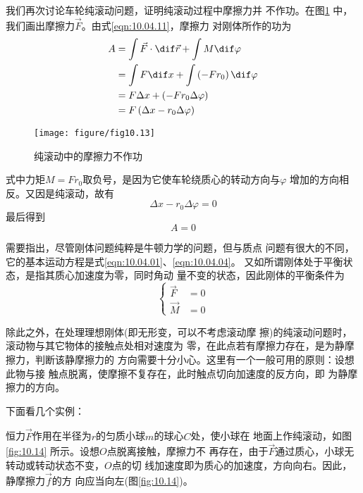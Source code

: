 \documentclass[../outline-of-mechanics.tex]{subfiles}
\begin{document}
我们再次讨论车轮纯滚动问题，证明纯滚动过程中摩擦力并
不作功。在图\ref{fig:10.13} 中，我们画出摩擦力$\vec{F}$。由式\eqref{eqn:10.04.11}，摩擦力
对刚体所作的功为
\begin{equation*}
  \begin{split}
    A &= \int \vec{ F } \cdot \dif \vec{r} + \int M \dif \varphi \\
    &= \int F \dif x + \int \left( - F r _ { 0 } \right) \dif \varphi \\
    &= F \Delta x + \left( - F r _ { 0 } \Delta \varphi \right) \\%
    &= F \left( \Delta x - r _ { 0 } \Delta \varphi \right)
  \end{split}
\end{equation*}

\clearpage
\begin{figure}[h]
  \centering
  \texttt{[image: figure/fig10.13]}
  \caption{纯滚动中的摩擦力不作功}
  \label{fig:10.13}
\end{figure}
式中力矩$ M = F r _ { 0 } $取负号，是因为它使车轮绕质心的转动方向与$ \varphi $
增加的方向相反。又因是纯滚动，故有
\begin{equation*}
  \Delta x - r _ { 0 } \Delta \varphi = 0
\end{equation*}
最后得到
\begin{equation*}
  A = 0
\end{equation*}

需要指出，尽管刚体问题纯粹是牛顿力学的问题，但与质点
问题有很大的不同，它的基本运动方程是式\eqref{eqn:10.04.01}、\eqref{eqn:10.04.04}。
又如所谓刚体处于平衡状态，是指其质心加速度为零，同时角动
量不变的状态，因此刚体的平衡条件为
\begin{equation}\label{eqn:10.04.12}
  \begin{cases}
    \vec{ F } & = 0 \\
    \vec{ M } & = 0
  \end{cases}
\end{equation}

除此之外，在处理理想刚体(即无形变，可以不考虑滚动摩
擦)的纯滚动问题时，滚动物与其它物体的接触点处相对速度为
零，在此点若有摩擦力存在，是为静摩擦力，判断该静摩擦力的
方向需要十分小心。这里有一个一般可用的原则：设想此物与接
触点脱离，使摩擦不复存在，此时触点切向加速度的反方向，即
为静摩擦力的方向。

下面看几个实例：

恒力$\vec{ F }$作用在半径为$ r $的匀质小球$ m $的球心$ C $处，使小球在
地面上作纯滚动，如图\ref{fig:10.14} 所示。设想$ O $点脱离接触，摩擦力不
再存在，由于$\vec{ F }$通过质心，小球无转动或转动状态不变，$ O $点的切
线加速度即为质心的加速度，方向向右。因此，静摩擦力$ \vec{f} $的方
向应当向左(图\ref{fig:10.14})。
\end{document}
